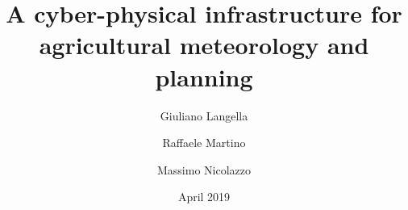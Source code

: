 \documentclass[authoryear,preprint,review,12pt]{elsarticle}
\begin{document}
\begin{frontmatter}



\title{A cyber-physical infrastructure for agricultural meteorology and planning}


\author[dia]{Giuliano Langella}
\address[dia]{Department of Agriculture, University of Naples Federico II, Via Università 100, 80055 Portici, NA, Italy}

\author[deeit]{Raffaele Martino}
\author[deeit]{Massimo Nicolazzo}
\address[deeit]{Department of Electrical Engineering and Information Technology, University of Naples Federico II, Via Claudio 21, 80125 Naples, NA, Italy}

\date{April 2019}

\begin{abstract}


\end{abstract}
\end{frontmatter}
\end{document}
